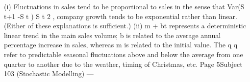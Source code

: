 (i) Fluctuations in sales tend to be proportional to sales in the sense that
Var(S t+1 -S t ) \mu S t 2 , company growth tends to be exponential rather than
linear. (Either of these explanations is sufficient.)
(ii) m + bt represents a deterministic linear trend in the main sales volume; b
is related to the average annual percentage increase in sales, whereas m is
related to the initial value.
The q q refer to predictable seasonal fluctuations above and below the
average from one quarter to another due to the weather, timing of
Christmas, etc.
Page 5Subject 103 (Stochastic Modelling) — 

